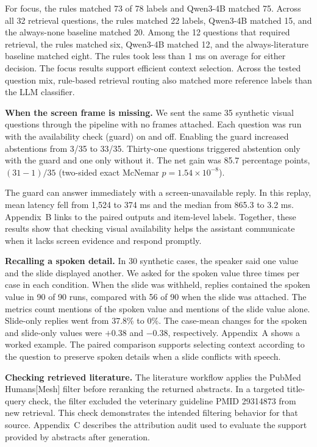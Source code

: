 \documentclass[11pt]{article}
\begin{document}
For focus, the rules matched 73 of 78 labels and Qwen3-4B matched 75. Across all 32 retrieval questions, the rules matched 22 labels, Qwen3-4B matched 15, and the always-none baseline matched 20. Among the 12 questions that required retrieval, the rules matched six, Qwen3-4B matched 12, and the always-literature baseline matched eight. The rules took less than 1 ms on average for either decision. The focus results support efficient context selection. Across the tested question mix, rule-based retrieval routing also matched more reference labels than the LLM classifier.

\textbf{When the screen frame is missing.} We sent the same 35 synthetic visual questions through the pipeline with no frames attached. Each question was run with the availability check (guard) on and off. Enabling the guard increased abstentions from 3/35 to 33/35. Thirty-one questions triggered abstention only with the guard and one only without it. The net gain was 85.7 percentage points, $(31-1)/35$ (two-sided exact McNemar $p=1.54\times10^{-8}$).

The guard can answer immediately with a screen-unavailable reply. In this replay, mean latency fell from 1{,}524 to 374 ms and the median from 865.3 to 3.2 ms. Appendix~B links to the paired outputs and item-level labels. Together, these results show that checking visual availability helps the assistant communicate when it lacks screen evidence and respond promptly.

\textbf{Recalling a spoken detail.} In 30 synthetic cases, the speaker said one value and the slide displayed another. We asked for the spoken value three times per case in each condition. When the slide was withheld, replies contained the spoken value in 90 of 90 runs, compared with 56 of 90 when the slide was attached. The metrics count mentions of the spoken value and mentions of the slide value alone. Slide-only replies went from 37.8\% to 0\%. The case-mean changes for the spoken and slide-only values were $+0.38$ and $-0.38$, respectively. Appendix~A shows a worked example. The paired comparison supports selecting context according to the question to preserve spoken details when a slide conflicts with speech.

\textbf{Checking retrieved literature.} The literature workflow applies the PubMed Humans[Mesh] filter before reranking the returned abstracts. In a targeted title-query check, the filter excluded the veterinary guideline PMID 29314873 from new retrieval. This check demonstrates the intended filtering behavior for that source. Appendix~C describes the attribution audit used to evaluate the support provided by abstracts after generation.
\end{document}

